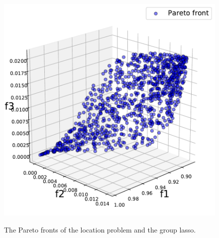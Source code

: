 \documentclass{article}
\begin{document}
\begin{figure}[ht]
\begin{minipage}{0.49\hsize}
    \includegraphics[width=1\textwidth]{neurips2019/fig/pareto_grouplasso.pdf}
    \label{fig:Pareto-front-group-lasso}
 \end{minipage}
 \caption{The Pareto fronts of the location problem and the group lasso.}
\label{fig:Pareto-fronts}
\end{figure}

\end{document}

